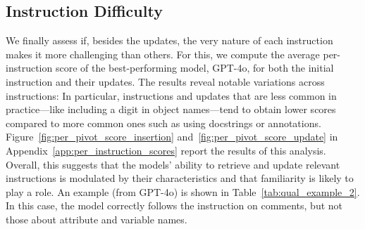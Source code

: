 \subsection{Instruction Difficulty}
We finally assess if, besides the updates,
the very nature of each instruction makes it more challenging than others.
For this, we compute the average per-instruction score of the best-performing model, GPT-4o, for both the initial instruction and their updates.  
The results reveal notable variations across instructions: 
In particular, instructions and updates that are less common in practice---like including a digit in object names---tend to obtain lower scores compared to more common ones such as using docstrings or annotations. 
Figure~\ref{fig:per_pivot_score_insertion} and~\ref{fig:per_pivot_score_update} in Appendix~\ref{app:per_instruction_scores} report the results of this analysis. %
Overall, this suggests that the models' ability to retrieve and update relevant instructions is modulated by their characteristics and that familiarity is likely to play a role. 
An example (from GPT-4o) is shown in Table~\ref{tab:qual_example_2}. 
In this case, the model correctly follows the instruction on comments, but not those about attribute and variable names.









